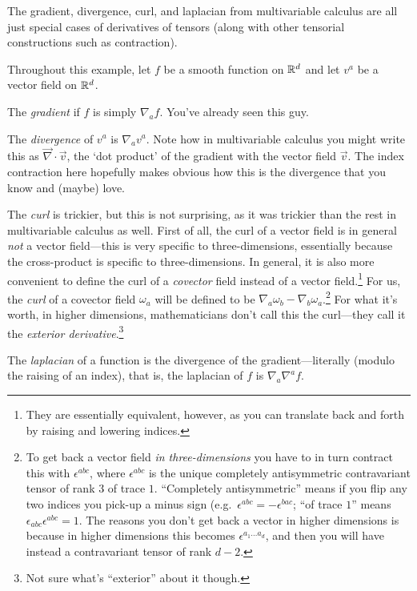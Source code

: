 \begin{exm}
The gradient, divergence, curl, and laplacian from multivariable calculus are all just special cases of derivatives of tensors (along with other tensorial constructions such as contraction).

Throughout this example, let $f$ be a smooth function on $\mathbb{R} ^d$ and let $v^a$ be a vector field on $\mathbb{R} ^d$. 

The \emph{gradient} if $f$ is simply $\nabla _af$.  You've already seen this guy.

The \emph{divergence} of $v^a$ is $\nabla _av^a$.  Note how in multivariable calculus you might write this as $\vec{\nabla}\cdot \vec{v}$, the `dot product' of the gradient with the vector field $\vec{v}$.  The index contraction here hopefully makes obvious how this is the divergence that you know and (maybe) love.

The \emph{curl} is trickier, but this is not surprising, as it was trickier than the rest in multivariable calculus as well.  First of all, the curl of a vector field is in general \emph{not} a vector field---this is very specific to three-dimensions, essentially because the cross-product is specific to three-dimensions.  In general, it is also more convenient to define the curl of a \emph{covector} field instead of a vector field.\footnote{They are essentially equivalent, however, as you can translate back and forth by raising and lowering indices.}  For us, the \emph{curl} of a covector field $\omega _a$ will be defined to be $\nabla _a\omega _b-\nabla _b\omega _a$.\footnote{To get back a vector field \emph{in three-dimensions} you have to in turn contract this with $\epsilon ^{abc}$, where $\epsilon ^{abc}$ is the unique completely antisymmetric contravariant tensor of rank $3$ of trace $1$.  ``Completely antisymmetric'' means if you flip any two indices you pick-up a minus sign (e.g.~$\epsilon ^{abc}=-\epsilon ^{bac}$; ``of trace $1$'' means $\epsilon _{abc}\epsilon ^{abc}=1$.  The reasons you don't get back a vector in higher dimensions is because in higher dimensions this becomes $\epsilon ^{a_1\ldots a_d}$, and then you will have instead a contravariant tensor of rank $d-2$.}  For what it's worth, in higher dimensions, mathematicians don't call this the curl---they call it the \emph{exterior derivative}.\footnote{Not sure what's ``exterior'' about it though.}

The \emph{laplacian} of a function is the divergence of the gradient---literally (modulo the raising of an index), that is, the laplacian of $f$ is $\nabla _a\nabla ^af$.
\end{exm}

